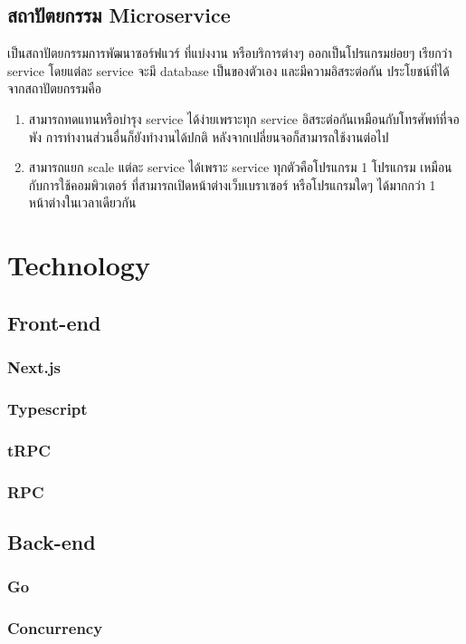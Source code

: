 \subsection{สถาปัตยกรรม Microservice}
เป็นสถาปัตยกรรมการพัฒนาซอร์ฟแวร์ ที่แบ่งงาน หรือบริการต่างๆ ออกเป็นโปรแกรมย่อยๆ
เรียกว่า service โดยแต่ละ service จะมี database เป็นของตัวเอง และมีความอิสระต่อกัน 
ประโยชน์ที่ได้จากสถาปัตยกรรมคือ 
\begin{enumerate}
      \item สามารถทดแทนหรือบำรุง service ได้ง่ายเพราะทุก service อิสระต่อกันเหมือนกับโทรศัพท์ที่จอพัง 
      การทำงานส่วนอื่นก็ยังทำงานได้ปกติ หลังจากเปลี่ยนจอก็สามารถใช้งานต่อไป
      \item สามารถแยก scale แต่ละ service ได้เพราะ service ทุกตัวคือโปรแกรม 1 โปรแกรม เหมือนกับการใช้คอมพิวเตอร์
      ที่สามารถเปิดหน้าต่างเว็บเบราเซอร์ หรือโปรแกรมใดๆ ได้มากกว่า 1 หน้าต่างในเวลาเดียวกัน
\end{enumerate}

\section{Technology}
\subsection{Front-end}
\subsubsection{Next.js}
\subsubsection{Typescript}
\subsubsection{tRPC}
\subsubsection{RPC}
\subsection{Back-end}
\subsubsection{Go}
\subsubsection{Concurrency}

